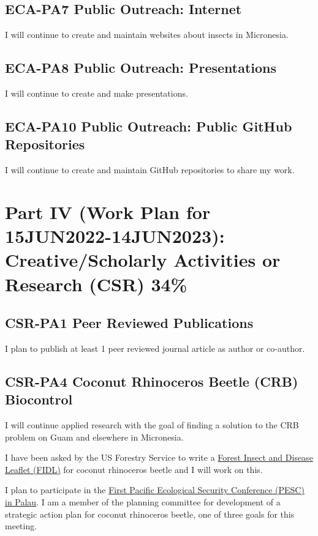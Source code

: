 \subsection{ECA-PA7 Public Outreach: Internet}
I will continue to create and maintain websites about insects in Micronesia.

\subsection{ECA-PA8 Public Outreach: Presentations}
I will continue to create and make presentations.

\subsection{ECA-PA10 Public Outreach: Public GitHub Repositories}
I will continue to create and maintain GitHub repositories to share my work.


\newpage
\section{Part IV (Work Plan for 15JUN2022-14JUN2023): Creative/Scholarly Activities or Research (CSR) 34\%}

\subsection{CSR-PA1 Peer Reviewed Publications} 
I plan to publish at least 1 peer reviewed journal article as author or co-author.

\subsection{CSR-PA4 Coconut Rhinoceros Beetle (CRB) Biocontrol}
I will continue applied research with the goal of finding a solution to the CRB problem on Guam and elsewhere in Micronesia.

I have been asked by the US Forestry Service to write a \href{https://www.fs.fed.us/foresthealth/publications/fidls/index.shtml}{Forest Insect and Disease Leaflet (FIDL)} for coconut rhinoceros beetle and I will work on this. 

I plan to participate in the \href{https://www.pacificrisa.org/pesc/}{First Pacific Ecological Security Conference (PESC) in Palau}. I am a member of the planning committee for development of a strategic action plan for coconut rhinoceros beetle, one of three goals for this meeting.


